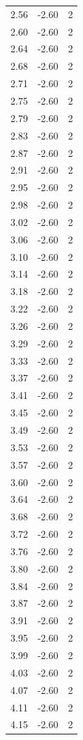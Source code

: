 \begin{longtable}{lrr}
  2.56 & -2.60 & 2 \\
  2.60 & -2.60 & 2 \\
  2.64 & -2.60 & 2 \\
  2.68 & -2.60 & 2 \\
  2.71 & -2.60 & 2 \\
  2.75 & -2.60 & 2 \\
  2.79 & -2.60 & 2 \\
  2.83 & -2.60 & 2 \\
  2.87 & -2.60 & 2 \\
  2.91 & -2.60 & 2 \\
  2.95 & -2.60 & 2 \\
  2.98 & -2.60 & 2 \\
  3.02 & -2.60 & 2 \\
  3.06 & -2.60 & 2 \\
  3.10 & -2.60 & 2 \\
  3.14 & -2.60 & 2 \\
  3.18 & -2.60 & 2 \\
  3.22 & -2.60 & 2 \\
  3.26 & -2.60 & 2 \\
  3.29 & -2.60 & 2 \\
  3.33 & -2.60 & 2 \\
  3.37 & -2.60 & 2 \\
  3.41 & -2.60 & 2 \\
  3.45 & -2.60 & 2 \\
  3.49 & -2.60 & 2 \\
  3.53 & -2.60 & 2 \\
  3.57 & -2.60 & 2 \\
  3.60 & -2.60 & 2 \\
  3.64 & -2.60 & 2 \\
  3.68 & -2.60 & 2 \\
  3.72 & -2.60 & 2 \\
  3.76 & -2.60 & 2 \\
  3.80 & -2.60 & 2 \\
  3.84 & -2.60 & 2 \\
  3.87 & -2.60 & 2 \\
  3.91 & -2.60 & 2 \\
  3.95 & -2.60 & 2 \\
  3.99 & -2.60 & 2 \\
  4.03 & -2.60 & 2 \\
  4.07 & -2.60 & 2 \\
  4.11 & -2.60 & 2 \\
  4.15 & -2.60 & 2 \\

\end{longtable}
